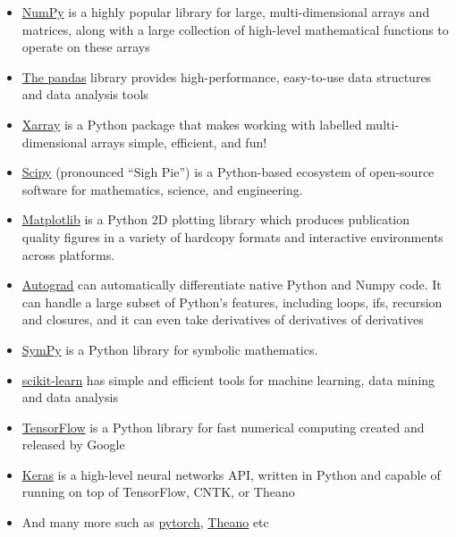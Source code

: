 \documentclass[%
oneside,                 %
final,                   %
10pt]{article}
\begin{document}
\begin{itemize}
\item \href{{https://www.numpy.org/}}{NumPy} is a highly popular library for large, multi-dimensional arrays and matrices, along with a large collection of high-level mathematical functions to operate on these arrays

\item \href{{https://pandas.pydata.org/}}{The pandas} library provides high-performance, easy-to-use data structures and data analysis tools 

\item \href{{http://xarray.pydata.org/en/stable/}}{Xarray} is a Python package that makes working with labelled multi-dimensional arrays simple, efficient, and fun!

\item \href{{https://www.scipy.org/}}{Scipy} (pronounced “Sigh Pie”) is a Python-based ecosystem of open-source software for mathematics, science, and engineering. 

\item \href{{https://matplotlib.org/}}{Matplotlib} is a Python 2D plotting library which produces publication quality figures in a variety of hardcopy formats and interactive environments across platforms.

\item \href{{https://github.com/HIPS/autograd}}{Autograd} can automatically differentiate native Python and Numpy code. It can handle a large subset of Python's features, including loops, ifs, recursion and closures, and it can even take derivatives of derivatives of derivatives

\item \href{{https://www.sympy.org/en/index.html}}{SymPy} is a Python library for symbolic mathematics. 

\item \href{{https://scikit-learn.org/stable/}}{scikit-learn} has simple and efficient tools for machine learning, data mining and data analysis

\item \href{{https://www.tensorflow.org/}}{TensorFlow} is a Python library for fast numerical computing created and released by Google

\item \href{{https://keras.io/}}{Keras} is a high-level neural networks API, written in Python and capable of running on top of TensorFlow, CNTK, or Theano

\item And many more such as \href{{https://pytorch.org/}}{pytorch},  \href{{https://pypi.org/project/Theano/}}{Theano} etc 
\end{itemize}
\end{document}
